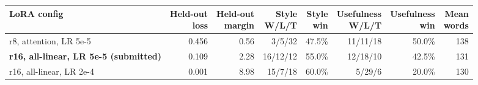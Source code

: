 \footnotesize
\begin{tabularx}{\linewidth}{@{}Xrrrrrrr@{}}
\toprule
LoRA config & \shortstack{Held-out\\loss} & \shortstack{Held-out\\margin} & \shortstack{Style\\W/L/T} & \shortstack{Style\\win} & \shortstack{Usefulness\\W/L/T} & \shortstack{Usefulness\\win} & \shortstack{Mean\\words} \\
\midrule
r8, attention, LR 5e-5 & 0.456 & 0.56 & 3/5/32 & 47.5\% & 11/11/18 & 50.0\% & 138 \\
\textbf{r16, all-linear, LR 5e-5 (submitted)} & 0.109 & 2.28 & 16/12/12 & 55.0\% & 12/18/10 & 42.5\% & 131 \\
r16, all-linear, LR 2e-4 & 0.001 & 8.98 & 15/7/18 & 60.0\% & 5/29/6 & 20.0\% & 130 \\
\bottomrule
\end{tabularx}
